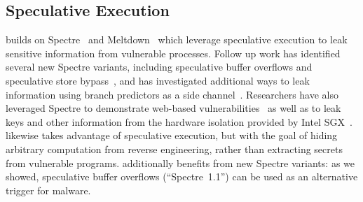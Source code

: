 \subsection{Speculative Execution}


\speculake builds on Spectre~\cite{spectre} and Meltdown~\cite{meltdown} which
leverage speculative execution to leak sensitive information from vulnerable
processes.  Follow up work has identified several new Spectre variants,
including speculative buffer overflows and speculative store
bypass~\cite{kiriansky2018speculative,spec-store-bypass}, and has investigated
additional ways to leak information using branch
predictors as a side channel~\cite{evtyushkin2018branchscope}.
Researchers have also leveraged Spectre to demonstrate web-based
vulnerabilities~\cite{genkin2018drive,schwarz2018netspectre} as well as to leak
keys and other information from the hardware isolation provided by Intel
SGX~\cite{spectre_sgx,chen2018sgxpectre,foreshadow}.
\speculake likewise takes advantage of speculative execution, but with the goal
of hiding arbitrary computation from reverse engineering, rather than extracting
secrets from vulnerable programs. \speculake additionally benefits from
new Spectre variants: as we showed, speculative buffer overflows (``Spectre~1.1'')
can be used as an alternative trigger for malware.

